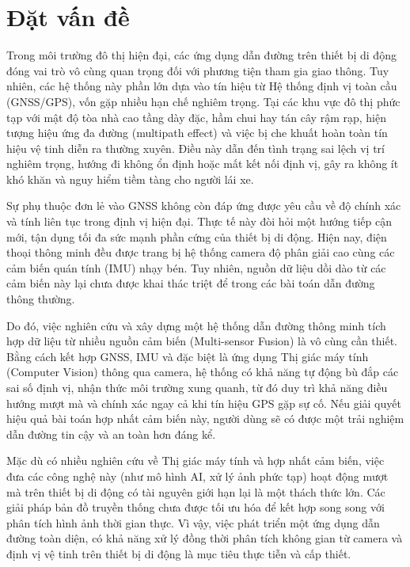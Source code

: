 \documentclass[../DoAn.tex]{subfiles}
\begin{document}
\section{Đặt vấn đề}
\label{section:1.1}
Trong môi trường đô thị hiện đại, các ứng dụng dẫn đường trên thiết bị di động đóng vai trò vô cùng quan trọng đối với phương tiện tham gia giao thông. Tuy nhiên, các hệ thống này phần lớn dựa vào tín hiệu từ Hệ thống định vị toàn cầu (GNSS/GPS), vốn gặp nhiều hạn chế nghiêm trọng. Tại các khu vực đô thị phức tạp với mật độ tòa nhà cao tầng dày đặc, hầm chui hay tán cây rậm rạp, hiện tượng hiệu ứng đa đường (multipath effect) và việc bị che khuất hoàn toàn tín hiệu vệ tinh diễn ra thường xuyên. Điều này dẫn đến tình trạng sai lệch vị trí nghiêm trọng, hướng đi không ổn định hoặc mất kết nối định vị, gây ra không ít khó khăn và nguy hiểm tiềm tàng cho người lái xe.

Sự phụ thuộc đơn lẻ vào GNSS không còn đáp ứng được yêu cầu về độ chính xác và tính liên tục trong định vị hiện đại. Thực tế này đòi hỏi một hướng tiếp cận mới, tận dụng tối đa sức mạnh phần cứng của thiết bị di động. Hiện nay, điện thoại thông minh đều được trang bị hệ thống camera độ phân giải cao cùng các cảm biến quán tính (IMU) nhạy bén. Tuy nhiên, nguồn dữ liệu dồi dào từ các cảm biến này lại chưa được khai thác triệt để trong các bài toán dẫn đường thông thường. 

Do đó, việc nghiên cứu và xây dựng một hệ thống dẫn đường thông minh tích hợp dữ liệu từ nhiều nguồn cảm biến (Multi-sensor Fusion) là vô cùng cần thiết. Bằng cách kết hợp GNSS, IMU và đặc biệt là ứng dụng Thị giác máy tính (Computer Vision) thông qua camera, hệ thống có khả năng tự động bù đắp các sai số định vị, nhận thức môi trường xung quanh, từ đó duy trì khả năng điều hướng mượt mà và chính xác ngay cả khi tín hiệu GPS gặp sự cố. Nếu giải quyết hiệu quả bài toán hợp nhất cảm biến này, người dùng sẽ có được một trải nghiệm dẫn đường tin cậy và an toàn hơn đáng kể.

Mặc dù có nhiều nghiên cứu về Thị giác máy tính và hợp nhất cảm biến, việc đưa các công nghệ này (như mô hình AI, xử lý ảnh phức tạp) hoạt động mượt mà trên thiết bị di động có tài nguyên giới hạn lại là một thách thức lớn. Các giải pháp bản đồ truyền thống chưa được tối ưu hóa để kết hợp song song với phân tích hình ảnh thời gian thực. Vì vậy, việc phát triển một ứng dụng dẫn đường toàn diện, có khả năng xử lý đồng thời phân tích không gian từ camera và định vị vệ tinh trên thiết bị di động là mục tiêu thực tiễn và cấp thiết.
\end{document}
